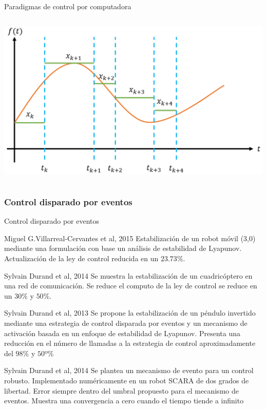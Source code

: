 \begin{frame}[shrink=25]{Paradigmas de control por computadora}
\begin{columns}[T]
		\begin{column}{0.5\textwidth}
			\vspace{2.5cm}
			\centering
			\includegraphics[scale=0.35]{Introduccion/senal-asinc.png}
		\end{column}
	\end{columns}
\end{frame}

\subsubsection{Control disparado por eventos}
\begin{frame}[shrink=25]{Control disparado por eventos}
	\begin{block}{Miguel G.Villarreal-Cervantes et al, 2015}
		Estabilización de un robot móvil (3,0) mediante una formulación con base un análisis de estabilidad de Lyapunov. Actualización de la ley de control reducida en un $23.73\%$.
	\end{block}
	\begin{block}{Sylvain Durand et al, 2014}
		Se muestra la estabilización de un cuadricóptero en una red de comunicación. Se reduce el computo de la ley de control se reduce en un $30\%$ y $50\%$.
	\end{block}
	\begin{block}{Sylvain Durand et al, 2013}
		Se propone la estabilización de un péndulo invertido mediante una estrategia de control disparada por eventos y un mecanismo de activación basada en un enfoque de estabilidad de Lyapunov. Presenta una reducción en el número de llamadas a la estrategia de control aproximadamente del $98\%$ y $50º\%$
	\end{block}
	\begin{block}{Sylvain Durand et al, 2014}
		Se plantea un mecanismo de evento para un control robusto.	Implementado numéricamente en un robot SCARA de dos grados de libertad. Error siempre dentro del umbral propuesto para el mecanismo de eventos. Muestra una convergencia a cero cuando el tiempo tiende a infinito
	\end{block}
	
\end{frame}

